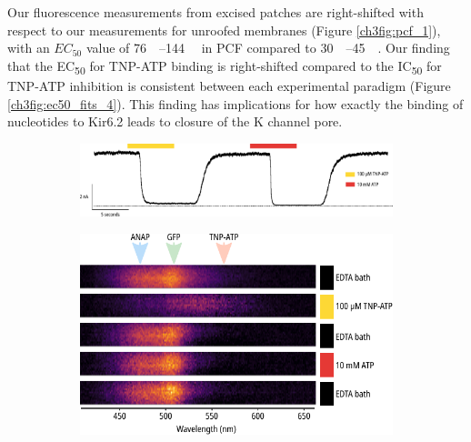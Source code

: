 Our fluorescence measurements from excised patches are right-shifted with respect to our measurements for unroofed membranes (Figure \ref{ch3fig:pcf_1}), with an $EC_{50}$ value of \SIrange{76}{144}{\micro\Molar} in PCF compared to \SIrange{30}{45}{\micro\Molar}.
Our finding that the EC\textsubscript{50} for TNP-ATP binding is right-shifted compared to the IC\textsubscript{50} for TNP-ATP inhibition is consistent between each experimental paradigm (Figure \ref{ch3fig:ec50_fits_4}).
This finding has implications for how exactly the binding of nucleotides to Kir6.2 leads to closure of the K\ATP{} channel pore.

\begin{figure}[hbtp]
	\centering
	\begin{subfigure}[t]{0.9\textwidth}
		\caption{}\label{ch3fig:atp_tnpatp_trace}
		\centering
		\includegraphics[width=\textwidth]{atp_tnpatp_trace.pdf}
	\end{subfigure}
	\vfill
	\begin{subfigure}[t]{0.5\textwidth}
		\caption{}\label{ch3fig:atp_tnpatp_spectra_1}
		\centering
		\includegraphics[width=\textwidth]{atp_tnpatp_spectral_images.pdf}
	\end{subfigure}
	\hfill
	\begin{subfigure}[t]{0.4\textwidth}
		\caption{}\label{ch3fig:atp_tnpatp_spectra_2}
		\centering

\end{subfigure}
\end{figure}
